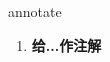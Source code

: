 
\begin{frame}
{\huge annotate}
\begin{center}
\begin{enumerate}\Large
  \item \textbf{给...作注解}
\end{enumerate}
\end{center}
\end{frame}
